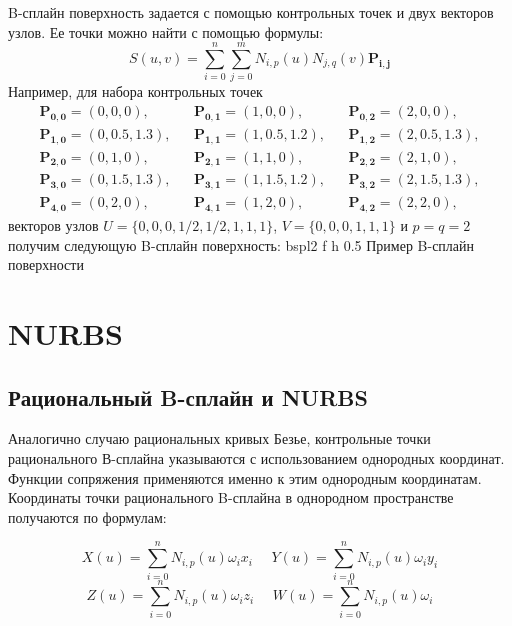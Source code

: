 \documentclass{bmstu}
\begin{document}
B-сплайн поверхность задается с помощью контрольных точек и двух векторов узлов. Ее точки можно найти с помощью формулы:
\begin{equation}
    S(u, v) = \sum\limits_{i=0}^n\sum\limits_{j=0}^m N_{i,p}(u)N_{j,q}(v)\mathbf{P_{i,j}}
\end{equation}
Например, для набора контрольных точек
\begin{equation*}
    \begin{matrix}

        \mathbf{P_{0,0}}=(0,0,0),     &  & \mathbf{P_{0,1}}=(1,0,0),       &  & \mathbf{P_{0,2}}=(2,0,0),     \\
        \mathbf{P_{1,0}}=(0,0.5,1.3), &  & \mathbf{P_{1,1}}=(1,0.5,1.2)  , &  & \mathbf{P_{1,2}}=(2,0.5,1.3), \\
        \mathbf{P_{2,0}}=(0,1,0)    , &  & \mathbf{P_{2,1}}=(1,1,0)      , &  & \mathbf{P_{2,2}}=(2,1,0)    , \\
        \mathbf{P_{3,0}}=(0,1.5,1.3), &  & \mathbf{P_{3,1}}=(1,1.5,1.2)  , &  & \mathbf{P_{3,2}}=(2,1.5,1.3), \\
        \mathbf{P_{4,0}}=(0,2,0)    , &  & \mathbf{P_{4,1}}=(1,2,0)      , &  & \mathbf{P_{4,2}}=(2,2,0)    ,
    \end{matrix}
\end{equation*}
векторов узлов $U = \{0,0,0,1/2,1/2,1,1,1\}$, $V = \{0,0,0,1,1,1\}$ и $p=q=2$ получим следующую B-сплайн поверхность:
{bspl2} %
{f} %
{h} %
{0.5\textwidth} %
{Пример B-сплайн поверхности} %
\section{NURBS}
\subsection{Рациональный B-сплайн и NURBS}
Аналогично случаю рациональных кривых Безье, контрольные точки
рационального В-сплайна указываются с использованием однородных
координат. Функции сопряжения применяются именно к этим однородным
координатам. Координаты точки рационального B-сплайна в однородном
пространстве получаются по формулам:

\begin{equation*}
    X(u) = \sum\limits_{i=0}^nN_{i,p}(u)\omega_ix_i~~~~~~ Y(u) = \sum\limits_{i=0}^nN_{i,p}(u)\omega_iy_i
\end{equation*}
\begin{equation*}
    Z(u) = \sum\limits_{i=0}^nN_{i,p}(u)\omega_iz_i~~~~~~ W(u) = \sum\limits_{i=0}^nN_{i,p}(u)\omega_i
\end{equation*}
\end{document}
